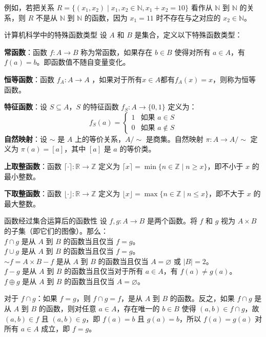 \documentclass[lang=cn,11pt]{elegantbook}
\begin{document}
例如，若把关系 $R=\{(x_1,x_2)\mid x_1,x_2\in\mathbb{N},x_1+x_2=10\}$ 看作从 $\mathbb{N}$ 到 $\mathbb{N}$ 的关系，则 $R$ 不是从 $\mathbb{N}$ 到 $\mathbb{N}$ 的函数，因为 $x_1=11$ 时不存在与之对应的 $x_2\in\mathbb{N}$。
\begin{definition}{计算机科学中的特殊函数类型}
设 $A$ 和 $B$ 是集合，定义以下特殊函数类型：

\textbf{常函数}：函数 $f: A \to B$ 称为常函数，如果存在 $b \in B$ 使得对所有 $a \in A$，有 $f(a) = b$。即函数值不随自变量变化。

\textbf{恒等函数}：函数 $f_A: A \to A$ ，如果对于所有$x\in A$都有$f_A(x)=x$，则称为恒等函数。

\textbf{特征函数}：设 $S \subseteq A$，$S$ 的特征函数 $f_S: A \to \{0,1\}$ 定义为：
\[
f_S(a) = 
\begin{cases}
1 & \text{如果 } a \in S \\
0 & \text{如果 } a \notin S
\end{cases}
\]
\textbf{自然映射}：设 $\sim$ 是 $A$ 上的等价关系，$A/\sim$ 是商集。自然映射 $\pi: A \to A/\sim$ 定义为 $\pi(a) = [a]$，其中 $[a]$ 是 $a$ 的等价类。

\textbf{上取整函数}：函数 $\lceil \cdot \rceil: \mathbb{R} \to \mathbb{Z}$ 定义为 $\lceil x \rceil = \min\{n \in \mathbb{Z} \mid n \geqslant x\}$，即不小于 $x$ 的最小整数。

\textbf{下取整函数}：函数 $\lfloor \cdot \rfloor: \mathbb{R} \to \mathbb{Z}$ 定义为 $\lfloor x \rfloor = \max\{n \in \mathbb{Z} \mid n \leqslant x\}$，即不大于 $x$ 的最大整数。
\end{definition}
\begin{theorem}{函数经过集合运算后的函数性}
设 $f, g: A \to B$ 是两个函数。将 $f$ 和 $g$ 视为 $A \times B$ 的子集（即它们的图像）。那么：\\
$f \cap g$ 是从 $A$ 到 $B$ 的函数当且仅当 $f = g$。\\
$f \cup g$ 是从 $A$ 到 $B$ 的函数当且仅当 $f = g$。\\
$\sim f = A \times B - f$ 是从 $A$ 到 $B$ 的函数当且仅当 $A = \varnothing$ 或 $|B|=2$。\\
$f - g$ 是从 $A$ 到 $B$ 的函数当且仅当对于所有 $a \in A$，有 $f(a) \neq g(a)$。\\
$f \oplus g$ 是从 $A$ 到 $B$ 的函数当且仅当 $A = \varnothing$。
\end{theorem}

对于 $f \cap g$：如果 $f = g$，则 $f \cap g = f$，是从 $A$ 到 $B$ 的函数。反之，如果 $f \cap g$ 是从 $A$ 到 $B$ 的函数，则对任意 $a \in A$，存在唯一的 $b \in B$ 使得 $(a, b) \in f \cap g$，故 $(a, b) \in f$ 且 $(a, b) \in g$，即 $f(a) = b$ 且 $g(a) = b$，所以 $f(a) = g(a)$ 对所有 $a \in A$ 成立，即 $f = g$。
\end{document}
